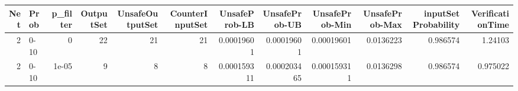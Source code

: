 \begin{tabular}{rlrrrrrrrrrr}
\hline
   Net & Prob   &   p\_filter &   OutputSet &   UnsafeOutputSet &   CounterInputSet &   UnsafeProb-LB &   UnsafeProb-UB &   UnsafeProb-Min &   UnsafeProb-Max &   inputSet Probability &   VerificationTime \\
\hline
     2 & 0-10   &      0     &          22 &                21 &                21 &     0.00019601  &     0.00019601  &      0.00019601  &        0.0136223 &               0.986574 &           1.24103  \\
     2 & 0-10   &      1e-05 &           9 &                 8 &                 8 &     0.000159311 &     0.000203465 &      0.000159311 &        0.0136298 &               0.986574 &           0.975022 \\
\hline
\end{tabular}

